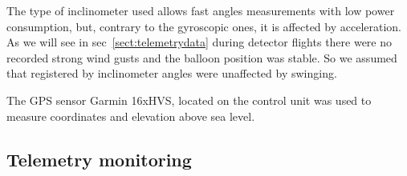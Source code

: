 \documentclass[final,5p,times,twocolumn]{elsarticle}
\begin{document}
The type of inclinometer used allows fast angles measurements with low power consumption, but, contrary to the gyroscopic ones, it is affected by acceleration. As we will see in sec~\ref{sect:telemetrydata} during detector flights there were no recorded strong wind gusts and the balloon position was stable. So we assumed that  registered by inclinometer angles were unaffected by swinging.

The GPS sensor Garmin 16xHVS, located on the control unit was used to measure coordinates and elevation above sea level.

\subsection{Telemetry monitoring\label{sect:telemetry}}


\end{document}
